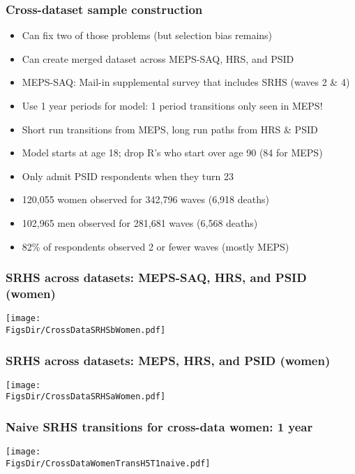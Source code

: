 \documentclass[aspectratio=169]{beamer}
\newcommand{\FigsDir}{../Figures}
\begin{document}
\begin{frame}\frametitle{Cross-dataset sample construction}
\begin{itemize}
\item <1->Can fix two of those problems (but selection bias remains)

\item <2->Can create merged dataset across MEPS-SAQ, HRS, and PSID

\item <2->MEPS-SAQ: Mail-in supplemental survey that includes SRHS (waves 2 \& 4)

\item <2->Use 1 year periods for model: 1 period transitions only seen in MEPS!

\item <3->Short run transitions from MEPS, long run paths from HRS \& PSID

\item <3->Model starts at age 18; drop R's who start over age 90 (84 for MEPS)

\item <3->Only admit PSID respondents when they turn 23

\item <4->120,055 women observed for 342,796 waves (6,918 deaths)

\item <4->102,965 men observed for 281,681 waves (6,568 deaths)

\item <4->82\% of respondents observed 2 or fewer waves (mostly MEPS)
\end{itemize}
\end{frame}


\begin{frame}\frametitle{SRHS across datasets: MEPS-SAQ, HRS, and PSID (women)}
\begin{center}
	\texttt{[image: \\FigsDir/CrossDataSRHSbWomen.pdf]}
\end{center}
\end{frame}

\begin{frame}\frametitle{SRHS across datasets: MEPS, HRS, and PSID (women)}
\begin{center}
	\texttt{[image: \\FigsDir/CrossDataSRHSaWomen.pdf]}
\end{center}
\end{frame}



\begin{frame}\frametitle{Naive SRHS transitions for cross-data women: 1 year}
\begin{center}
	\texttt{[image: \\FigsDir/CrossDataWomenTransH5T1naive.pdf]}
\end{center}
\end{frame}
\end{document}
